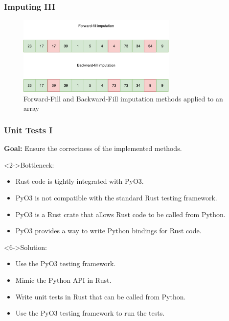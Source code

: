 \documentclass[t,english]{beamer}
\begin{document}
\begin{frame}
  \frametitle{Imputing III}
    \begin{figure}[H]
        \includegraphics[width=0.7\textwidth]{figures/imputing/imputation_2.png}
        \caption{Forward-Fill and Backward-Fill imputation methods applied to an array}
        \label{fig:imputing}
    \end{figure}
\end{frame}

\begin{frame}
  \frametitle{Unit Tests I}
  \textbf{Goal:} Ensure the correctness of the implemented methods.

  \begin{block}<2->{Bottleneck:}
    \begin{itemize}
      \item <2-> Rust code is tightly integrated with PyO3.
      \item <3-> PyO3 is not compatible with the standard Rust testing framework.
      \item <4-> PyO3 is a Rust crate that allows Rust code to be called from Python.
      \item <5-> PyO3 provides a way to write Python bindings for Rust code.
    \end{itemize}
  \end{block}

  \begin{block}<6->{Solution:}
    \begin{itemize}
      \item <6-> Use the PyO3 testing framework.
      \item <7-> Mimic the Python API in Rust.
      \item <8-> Write unit tests in Rust that can be called from Python.
      \item <9-> Use the PyO3 testing framework to run the tests.
    \end{itemize}
  \end{block}

\end{frame}
\end{document}
